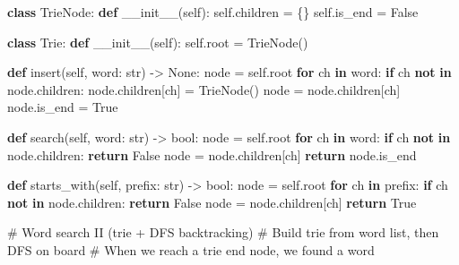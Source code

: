 \documentclass[11pt]{article}
\newenvironment{Shaded}{\begin{snugshade}}{\end{snugshade}}
\newcommand{\BuiltInTok}[1]{\textcolor[rgb]{0.50,0.55,0.55}{#1}}
\newcommand{\CommentTok}[1]{\textcolor[rgb]{0.48,0.49,0.49}{#1}}
\newcommand{\ControlFlowTok}[1]{\textcolor[rgb]{0.99,0.74,0.29}{\textbf{#1}}}
\newcommand{\FunctionTok}[1]{\textcolor[rgb]{0.56,0.27,0.68}{#1}}
\newcommand{\KeywordTok}[1]{\textcolor[rgb]{0.81,0.81,0.76}{\textbf{#1}}}
\newcommand{\NormalTok}[1]{\textcolor[rgb]{0.81,0.81,0.76}{#1}}
\newcommand{\OperatorTok}[1]{\textcolor[rgb]{0.81,0.81,0.76}{#1}}
\newcommand{\VariableTok}[1]{\textcolor[rgb]{0.15,0.68,0.68}{#1}}
\begin{document}
\begin{Shaded}
\begin{Highlighting}[]
\KeywordTok{class}\NormalTok{ TrieNode:}
    \KeywordTok{def} \FunctionTok{\_\_init\_\_}\NormalTok{(}\VariableTok{self}\NormalTok{):}
        \VariableTok{self}\NormalTok{.children }\OperatorTok{=}\NormalTok{ \{\}}
        \VariableTok{self}\NormalTok{.is\_end }\OperatorTok{=} \VariableTok{False}

\KeywordTok{class}\NormalTok{ Trie:}
    \KeywordTok{def} \FunctionTok{\_\_init\_\_}\NormalTok{(}\VariableTok{self}\NormalTok{):}
        \VariableTok{self}\NormalTok{.root }\OperatorTok{=}\NormalTok{ TrieNode()}

    \KeywordTok{def}\NormalTok{ insert(}\VariableTok{self}\NormalTok{, word: }\BuiltInTok{str}\NormalTok{) }\OperatorTok{{-}\textgreater{}} \VariableTok{None}\NormalTok{:}
\NormalTok{        node }\OperatorTok{=} \VariableTok{self}\NormalTok{.root}
        \ControlFlowTok{for}\NormalTok{ ch }\KeywordTok{in}\NormalTok{ word:}
            \ControlFlowTok{if}\NormalTok{ ch }\KeywordTok{not} \KeywordTok{in}\NormalTok{ node.children:}
\NormalTok{                node.children[ch] }\OperatorTok{=}\NormalTok{ TrieNode()}
\NormalTok{            node }\OperatorTok{=}\NormalTok{ node.children[ch]}
\NormalTok{        node.is\_end }\OperatorTok{=} \VariableTok{True}

    \KeywordTok{def}\NormalTok{ search(}\VariableTok{self}\NormalTok{, word: }\BuiltInTok{str}\NormalTok{) }\OperatorTok{{-}\textgreater{}} \BuiltInTok{bool}\NormalTok{:}
\NormalTok{        node }\OperatorTok{=} \VariableTok{self}\NormalTok{.root}
        \ControlFlowTok{for}\NormalTok{ ch }\KeywordTok{in}\NormalTok{ word:}
            \ControlFlowTok{if}\NormalTok{ ch }\KeywordTok{not} \KeywordTok{in}\NormalTok{ node.children:}
                \ControlFlowTok{return} \VariableTok{False}
\NormalTok{            node }\OperatorTok{=}\NormalTok{ node.children[ch]}
        \ControlFlowTok{return}\NormalTok{ node.is\_end}

    \KeywordTok{def}\NormalTok{ starts\_with(}\VariableTok{self}\NormalTok{, prefix: }\BuiltInTok{str}\NormalTok{) }\OperatorTok{{-}\textgreater{}} \BuiltInTok{bool}\NormalTok{:}
\NormalTok{        node }\OperatorTok{=} \VariableTok{self}\NormalTok{.root}
        \ControlFlowTok{for}\NormalTok{ ch }\KeywordTok{in}\NormalTok{ prefix:}
            \ControlFlowTok{if}\NormalTok{ ch }\KeywordTok{not} \KeywordTok{in}\NormalTok{ node.children:}
                \ControlFlowTok{return} \VariableTok{False}
\NormalTok{            node }\OperatorTok{=}\NormalTok{ node.children[ch]}
        \ControlFlowTok{return} \VariableTok{True}

\CommentTok{\# Word search II (trie + DFS backtracking)}
\CommentTok{\# Build trie from word list, then DFS on board}
\CommentTok{\# When we reach a trie end node, we found a word}
\end{Highlighting}
\end{Shaded}
\end{document}
